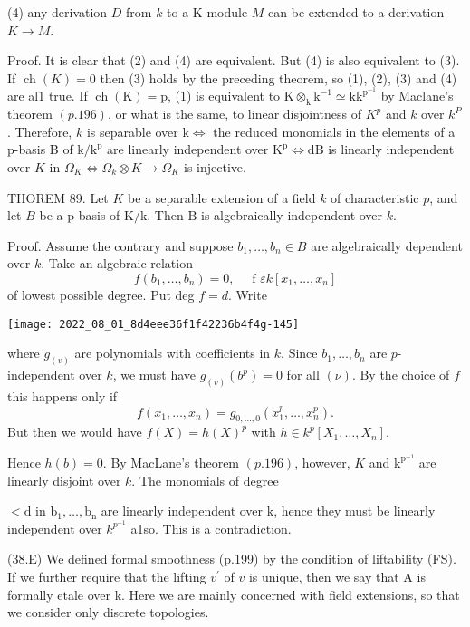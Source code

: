 (4) any derivation $D$ from $k$ to a K-module $M$ can be extended to a derivation $K \rightarrow M$.

Proof. It is clear that (2) and (4) are equivalent. But (4) is also equivalent to (3). If $\operatorname{ch}(K)=0$ then (3) holds by the preceding theorem, so (1), (2), (3) and (4) are al1 true. If $\operatorname{ch}(\mathrm{K})=\mathrm{p}$, (1) is equivalent to $\mathrm{K} \otimes_{\mathrm{k}} \mathrm{k}^{-1} \simeq \mathrm{kk}^{\mathrm{p}^{-1}}$ by Maclane's theorem $(p .196)$, or what is the same, to linear disjointness of $K^{p}$ and $k$ over $k^{P}$. Therefore, $k$ is separable over $\mathrm{k} \Leftrightarrow$ the reduced monomials in the elements of a p-basis B of $\mathrm{k} / \mathrm{k}^{\mathrm{p}}$ are linearly independent over $\mathrm{K}^{\mathrm{p}} \Leftrightarrow \mathrm{dB}$ is linearly independent over $K$ in $\Omega_{K} \Leftrightarrow \Omega_{k} \otimes K \rightarrow \Omega_{K}$ is injective.

THOREM 89. Let $K$ be a separable extension of a field $k$ of characteristic $p$, and let $B$ be a p-basis of $\mathrm{K} / \mathrm{k}$. Then $\mathrm{B}$ is algebraically independent over $k$.

Proof. Assume the contrary and suppose $b_{1}, \ldots, b_{n} \in B$ are algebraically dependent over $k$. Take an algebraic relation
$$
f\left(b_{1}, \ldots, b_{n}\right)=0, \quad \text { f } \varepsilon k\left[x_{1}, \ldots, x_{n}\right]
$$
of lowest possible degree. Put deg $f=d$. Write

\texttt{[image: 2022\_08\_01\_8d4eee36f1f42236b4f4g-145]}

where $g_{(v)}$ are polynomials with coefficients in $k$. Since $b_{1}, \ldots, b_{n}$ are $p$-independent over $k$, we must have $g_{(v)}\left(b^{p}\right)=0$ for all $(\nu)$. By the choice of $f$ this happens only if
$$
f\left(x_{1}, \ldots, x_{n}\right)=g_{0, \ldots, 0}\left(x_{1}^{p}, \ldots, x_{n}^{p}\right) .
$$
But then we would have $f(X)=h(X)^{p}$ with $h \in k^{p}\left[X_{1}, \ldots, X_{n}\right]$.

Hence $h(b)=0$. By MacLane's theorem $(p .196)$, however, $K$ and $\mathrm{k}^{\mathrm{p}^{-1}}$ are linearly disjoint over $k$. The monomials of degree

$<\mathrm{d}$ in $\mathrm{b}_{1}, \ldots, \mathrm{b}_{\mathrm{n}}$ are linearly independent over $\mathrm{k}$, hence they must be linearly independent over $k^{p^{-1}}$ a1so. This is a contradiction.

(38.E) We defined formal smoothness (p.199) by the condition of liftability (FS). If we further require that the lifting $v^{\prime}$ of $v$ is unique, then we say that A is formally etale over k. Here we are mainly concerned with field extensions, so that we consider only discrete topologies.

